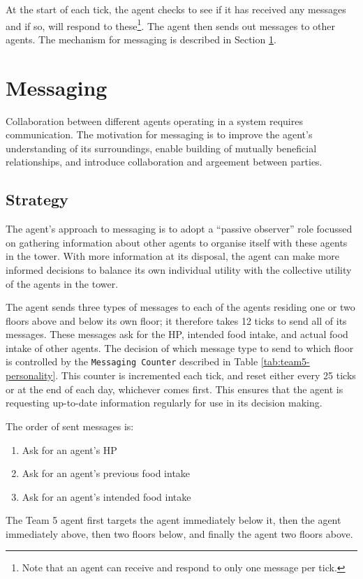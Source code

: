 At the start of each tick, the agent checks to see if it has received any messages and if so, will respond to these\footnote{Note that an agent can receive and respond to only one message per tick.}. The agent then sends out messages to other agents. The mechanism for messaging is described in Section \ref{sec:team5-messaging}.

\section{Messaging}\label{sec:team5-messaging}
Collaboration between different agents operating in a system requires communication. The motivation for messaging is to improve the agent's understanding of its surroundings, enable building of mutually beneficial relationships, and introduce collaboration and argeement between parties.

\subsection*{Strategy}\label{sec:team5-messaging-strategy}
The agent's approach to messaging is to adopt a ``passive observer'' role focussed on gathering information about other agents to organise itself with these agents in the tower. With more information at its disposal, the agent can make more informed decisions to balance its own individual utility with the collective utility of the agents in the tower.

The agent sends three types of messages to each of the agents residing one or two floors above and below its own floor; it therefore takes 12 ticks to send all of its messages. These messages ask for the HP, intended food intake, and actual food intake of other agents. The decision of which message type to send to which floor is controlled by the \texttt{Messaging Counter} described in Table \ref{tab:team5-personality}. This counter is incremented each tick, and reset either every 25 ticks or at the end of each day, whichever comes first. This ensures that the agent is requesting up-to-date information regularly for use in its decision making.

The order of sent messages is:
\begin{enumerate}
    \item Ask for an agent's HP
    \item Ask for an agent's previous food intake
    \item Ask for an agent's intended food intake
\end{enumerate}
The Team 5 agent first targets the agent immediately below it, then the agent immediately above, then two floors below, and finally the agent two floors above.

